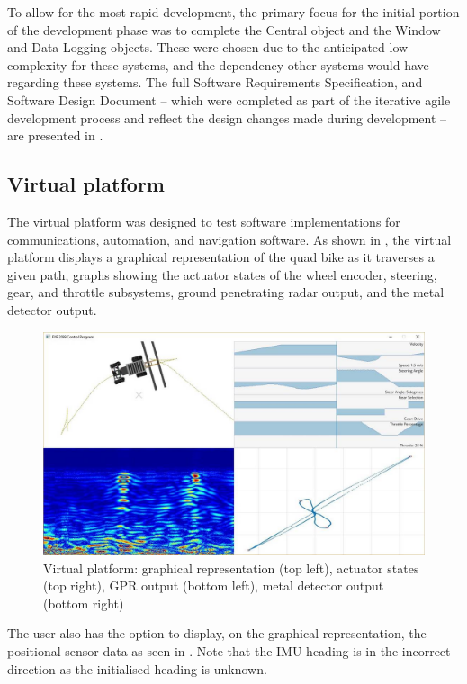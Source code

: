 \documentclass[main.tex]{subfiles}
\begin{document}
To allow for the most rapid development, the primary focus for the initial portion of the development phase was to complete the Central object and the Window and Data Logging objects. These were chosen due to the anticipated low complexity for these systems, and the dependency other systems would have regarding these systems. The full Software Requirements Specification, and Software Design Document – which were completed as part of the iterative agile development process and reflect the design changes made during development – are presented in .


\subsection{Virtual platform}
The virtual platform was designed to test software implementations for communications, automation, and navigation software. As shown in , the virtual platform displays a graphical representation of the quad bike as it traverses a given path, graphs showing the actuator states of the wheel encoder, steering, gear, and throttle subsystems, ground penetrating radar output, and the metal detector output.
\begin{figure}[ht]
\includegraphics[width=\textwidth]{4-DetailedDesign/virtualPlatform.jpg}
\centering
\caption[Virtual platform display window]{Virtual platform: graphical representation (top left), actuator states (top right), GPR output (bottom left), metal detector output (bottom right)} 
\end{figure}
The user also has the option to display, on the graphical representation, the positional sensor data as seen in . Note that the IMU heading is in the incorrect direction as the initialised heading is unknown.
\end{document}
